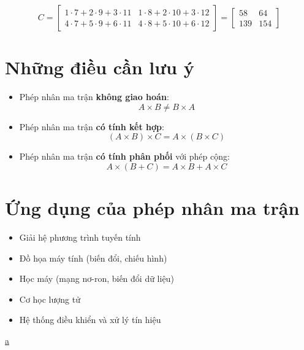 \documentclass[12pt]{article}
\begin{document}
\[
C = \begin{bmatrix}
1 \cdot 7 + 2 \cdot 9 + 3 \cdot 11 & 1 \cdot 8 + 2 \cdot 10 + 3 \cdot 12 \\
4 \cdot 7 + 5 \cdot 9 + 6 \cdot 11 & 4 \cdot 8 + 5 \cdot 10 + 6 \cdot 12
\end{bmatrix}
=
\begin{bmatrix}
58 & 64 \\
139 & 154
\end{bmatrix}
\]

\section*{Những điều cần lưu ý}

\begin{itemize}
    \item Phép nhân ma trận \textbf{không giao hoán}:
    \[
    A \times B \neq B \times A
    \]
    \item Phép nhân ma trận \textbf{có tính kết hợp}:
    \[
    (A \times B) \times C = A \times (B \times C)
    \]
    \item Phép nhân ma trận \textbf{có tính phân phối} với phép cộng:
    \[
    A \times (B + C) = A \times B + A \times C
    \]
\end{itemize}

\section*{Ứng dụng của phép nhân ma trận}

\begin{itemize}
    \item Giải hệ phương trình tuyến tính
    \item Đồ họa máy tính (biến đổi, chiếu hình)
    \item Học máy (mạng nơ-ron, biến đổi dữ liệu)
    \item Cơ học lượng tử
    \item Hệ thống điều khiển và xử lý tín hiệu
\end{itemize}

\href{https://tratoa.github.io/MAE101/Matrix%20Multiplication.html}{a}
\end{document}
